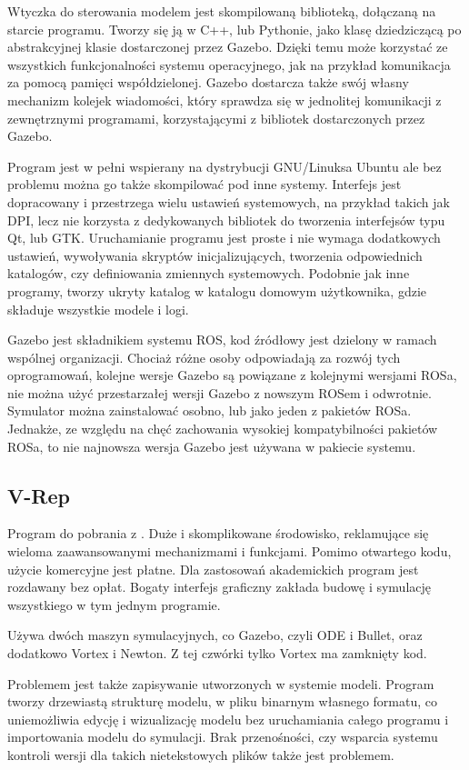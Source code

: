 	Wtyczka do sterowania modelem jest skompilowaną biblioteką, dołączaną na starcie programu.
	Tworzy się ją w C++, lub Pythonie, jako klasę dziedziczącą po abstrakcyjnej klasie dostarczonej przez Gazebo.
	Dzięki temu może korzystać ze wszystkich funkcjonalności systemu operacyjnego, jak na przykład komunikacja za pomocą pamięci współdzielonej.
	Gazebo dostarcza także swój własny mechanizm kolejek wiadomości, który sprawdza się w jednolitej komunikacji z zewnętrznymi programami, korzystającymi z bibliotek 
	dostarczonych przez Gazebo.

	Program jest w pełni wspierany na dystrybucji GNU/Linuksa Ubuntu ale bez problemu można go także skompilować pod inne systemy.
	Interfejs jest dopracowany i przestrzega wielu ustawień systemowych, na przykład takich jak DPI, lecz nie korzysta z dedykowanych bibliotek do tworzenia 
	interfejsów typu Qt, lub GTK.
	Uruchamianie programu jest proste i nie wymaga dodatkowych ustawień, wywoływania skryptów inicjalizujących, 
	tworzenia odpowiednich katalogów, czy definiowania zmiennych systemowych.
	Podobnie jak inne programy, tworzy ukryty katalog w katalogu domowym użytkownika, gdzie składuje wszystkie modele i logi.

	Gazebo jest składnikiem systemu ROS, kod źródłowy jest dzielony w ramach wspólnej organizacji.
	Chociaż różne osoby odpowiadają za rozwój tych oprogramowań,
	kolejne wersje Gazebo są powiązane z kolejnymi wersjami ROSa, nie można użyć przestarzałej wersji Gazebo z nowszym ROSem i odwrotnie.
	Symulator można zainstalować osobno, lub jako jeden z pakietów ROSa.
	Jednakże, ze względu na chęć zachowania wysokiej kompatybilności pakietów ROSa, to nie najnowsza wersja Gazebo jest używana w pakiecie systemu.

	\subsection{V-Rep}
	Program do pobrania z \cite{vrep_website}. Duże i skomplikowane środowisko, reklamujące się wieloma zaawansowanymi mechanizmami i funkcjami.
	Pomimo otwartego kodu, użycie komercyjne jest płatne. Dla zastosowań akademickich program jest rozdawany bez opłat.
	Bogaty interfejs graficzny zakłada budowę i symulację wszystkiego w tym jednym programie.

	Używa dwóch maszyn symulacyjnych, co Gazebo, czyli ODE i Bullet, oraz dodatkowo Vortex i Newton. Z tej czwórki tylko Vortex ma zamknięty kod.

	Problemem jest także zapisywanie utworzonych w systemie modeli.
	Program tworzy drzewiastą strukturę modelu, w pliku binarnym własnego formatu, co uniemożliwia edycję i wizualizację modelu bez uruchamiania całego programu 
	i importowania modelu do symulacji.
	Brak przenośności, czy wsparcia systemu kontroli wersji dla takich nietekstowych plików także jest problemem.

